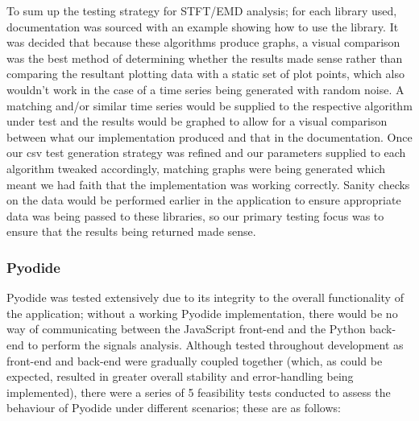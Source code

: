 To sum up the testing strategy for STFT/EMD analysis; for each library used, documentation was sourced with an example showing how to use the library. It was decided that because these algorithms produce graphs, a visual comparison was the best method of determining whether the results made sense rather than comparing the resultant plotting data with a static set of plot points, which also wouldn't work in the case of a time series being generated with random noise. A matching and/or similar time series would be supplied to the respective algorithm under test and the results would be graphed to allow for a visual comparison between what our implementation produced and that in the documentation. Once our csv test generation strategy was refined and our parameters supplied to each algorithm tweaked accordingly, matching graphs were being generated which meant we had faith that the implementation was working correctly. Sanity checks on the data would be performed earlier in the application to ensure appropriate data was being passed to these libraries, so our primary testing focus was to ensure that the results being returned made sense. 

\subsubsection{Pyodide}
Pyodide was tested extensively due to its integrity to the overall functionality of the application; without a working Pyodide implementation, there would be no way of communicating between the JavaScript front-end and the Python back-end to perform the signals analysis.
Although tested throughout development as front-end and back-end were gradually coupled together (which, as could be expected, resulted in greater overall stability and error-handling being implemented), there were a series of 5 feasibility tests conducted to assess the behaviour of Pyodide under different scenarios; these are as follows:

